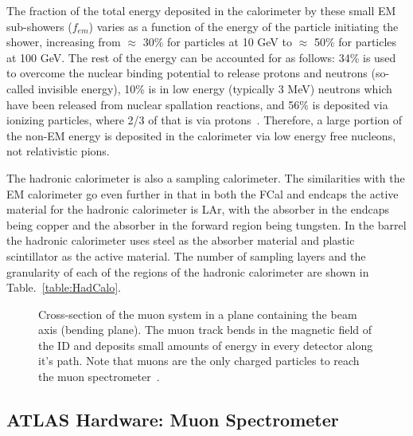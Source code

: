 The fraction of the total energy deposited in the calorimeter by these small EM sub-showers ($f_{em}$) varies as a function of the energy of the particle initiating the shower, increasing from $\approx$ 30\% for particles at 10 GeV to $\approx$ 50\% for particles at 100 GeV.  
The rest of the energy can be accounted for as follows: 34\% is used to overcome the nuclear binding potential to release protons and neutrons (so-called invisible energy), 10\% is in low energy (typically 3 MeV) neutrons which have been released from nuclear spallation reactions, and 56\% is deposited via ionizing particles, where 2/3 of that is via protons~\cite{Wigmans2008}.  
Therefore, a large portion of the non-EM energy is deposited in the calorimeter via low energy free nucleons, not relativistic pions.  

The hadronic calorimeter is also a sampling calorimeter.  
The similarities with the EM calorimeter go even further in that in both the FCal and endcaps the active material for the hadronic calorimeter is LAr, with the absorber in the endcaps being copper and the absorber in the forward region being tungsten.  
In the barrel the hadronic calorimeter uses steel as the absorber material and plastic scintillator as the active material.  
The number of sampling layers and the granularity of each of the regions of the hadronic calorimeter are shown in Table.~\ref{table:HadCalo}. 


\begin{figure}[!ht]
  \begin{center}
  \end{center}
  \caption[Grafic showing different particle interactions]
      {\small Cross-section of the muon system in a plane containing the beam axis (bending plane). The muon track bends in the magnetic field of the ID and deposits small amounts of energy in every detector along it's path.  Note that muons are the only charged particles to reach the muon spectrometer~\cite{JOIATLAS}.}
  \label{MuonSpectroFig}
\end{figure}


\subsection{ATLAS Hardware: Muon Spectrometer}

